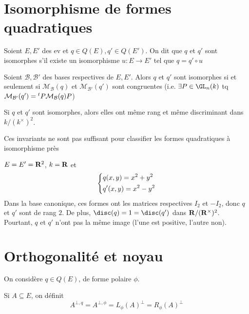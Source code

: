 \section{Isomorphisme de formes quadratiques}

\begin{dfn}
    Soient $E, E'$ des  ev et $q \in  Q(E), q' \in  Q(E')$. On dit que $q$ et  $q'$ sont isomorphes s'il existe un isomorphisme  $u:E\longrightarrow E'$ tel que $q=q'\circ u$
\end{dfn}

\begin{rem}
    Soient $\mathcal  B, \mathcal  B'$ des bases respectives de $E, E'$. Alors  $q$ et  $q'$ sont isomorphes  si et seulement si $\mathcal  M_{\mathcal  B} (q)$ et $\mathcal  M_{\mathcal  B'}(q')$ sont congruentes (i.e. $ \exists  P \in  \GL_n(k)$ tq $\mathcal M_{\mathcal  B'}(q')={}^t P\mathcal  M_{\mathcal  B}(q)P$)
\end{rem}

\begin{prop}
    Si $q$ et  $q'$ sont isomorphes, alors elles ont même rang et même discriminant dans $k / (k^\times )^2 $.
\end{prop}

\begin{rem}
Ces invariants ne sont pas suffisant pour classifier les formes quadratiques à isomorphisme près
\end{rem}

\begin{ex}
$E=E'=\mathbf R^2 $, $k=\mathbf R$ et  \[
\begin{dcases}
    q(x, y)=x^2 +y^2 \\
    q'(x, y)=x^2 -y^2
\end{dcases}
\] 
Dans la base canonique, ces formes ont les matrices respectives $I_2$ et  $-I_2$, donc  $q$ et  $q'$ sont de rang  $2$. De plus,  $\disc(q)=1=\disc(q')$ dans  $ \mathbf R / (\mathbf R^\times )^2 $. Pourtant, $q$ et  $q'$ n'ont pas la même image (l'une est positive, l'autre non).
\end{ex}

\section{Orthogonalité et noyau}

On considère $q \in  Q(E)$, de forme polaire $\phi$.

 \begin{dfn}
Si $A\subseteq E$, on définit  \[
    A^{\bot,q}=A^{\bot,\phi}=L_\phi(A)^\bot=R_\phi(A)^\bot
\]
\end{dfn}

